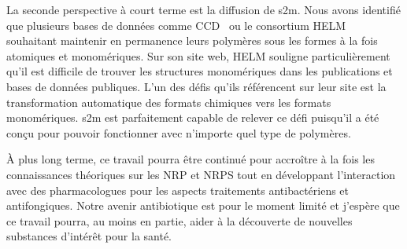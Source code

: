La seconde perspective à court terme est la diffusion de s2m.
Nous avons identifié que plusieurs bases de données comme CCD~\cite{rahman_small_2009} ou le consortium HELM~\cite{_helm_????} souhaitant maintenir en permanence leurs polymères sous les formes à la fois atomiques et monomériques.
Sur son site web, HELM souligne particulièrement qu'il est difficile de trouver les structures monomériques dans les publications et bases de données publiques.
L'un des défis qu'ils référencent sur leur site est la transformation automatique des formats chimiques vers les formats monomériques.
s2m est parfaitement capable de relever ce défi puisqu'il a été conçu pour pouvoir fonctionner avec n'importe quel type de polymères.

À plus long terme, ce travail pourra être continué pour accroître à la fois les connaissances théoriques sur les NRP et NRPS tout en développant l'interaction avec des pharmacologues pour les aspects traitements antibactériens et antifongiques.
Notre avenir antibiotique est pour le moment limité et j'espère que ce travail pourra, au moins en partie, aider à la découverte de nouvelles substances d'intérêt pour la santé.

























